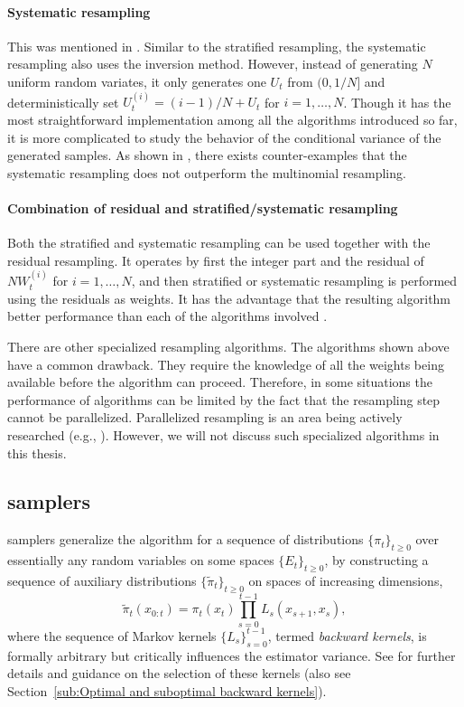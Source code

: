 \paragraph{Systematic resampling}

This was mentioned in \cite{Whitley:1994vx}. Similar to the stratified resampling, the systematic resampling also uses the inversion method. However, instead of generating $N$ uniform random variates, it only generates one $U_t$ from $(0, 1/N]$ and deterministically set $U_t^{(i)} = (i - 1)/N + U_t$ for $i = 1,\dots,N$. Though it has the most straightforward implementation among all the algorithms introduced so far, it is more complicated to study the behavior of the conditional variance of the generated samples. As shown in \cite{Douc:2005wa}, there exists counter-examples that the systematic resampling does not outperform the multinomial resampling.

\paragraph{Combination of residual and stratified/systematic resampling}

Both the stratified and systematic resampling can be used together with the residual resampling. It operates by first  the integer part and the residual of $NW_t^{(i)}$ for $i = 1,\dots,N$, and then stratified or systematic resampling is performed using the residuals as weights. It has the advantage that the resulting algorithm  better performance than each of the algorithms involved \cite{Douc:2005wa}.

There are other specialized resampling algorithms. The algorithms shown above have a common drawback. They require the knowledge of all the weights being available before the algorithm can proceed. Therefore, in some situations the performance of \smc algorithms can be limited by the fact that the resampling step cannot be parallelized. Parallelized resampling is an area being actively researched (e.g., \cite{Jun:2011vx,Murray:2013vx}). However, we will not discuss such specialized algorithms in this thesis.

\subsection[SMC samplers]{\protect\smc samplers}
\label{sub:SMC Samplers}

\smc samplers generalize the \sis algorithm for a sequence of distributions $\{\pi_t\}_{t\ge0}$ over essentially any random variables on some spaces $\{E_t\}_{t\ge0}$, by constructing a sequence of auxiliary distributions $\{\tilde\pi_t\}_{t\ge0}$ on spaces of increasing dimensions,
\begin{equation}
  \tilde\pi_t(x_{0:t})=\pi_t (x_t) \prod_{s=0}^{t-1} L_s(x_{s+1},x_s),
\end{equation}
where the sequence of Markov kernels $\{L_s\}_{s=0}^{t-1}$, termed \emph{backward kernels}, is formally arbitrary but critically influences the estimator variance. See \cite{DelMoral:2006hc} for further details and guidance on the selection of these kernels (also see Section~\ref{sub:Optimal and suboptimal backward kernels}).

